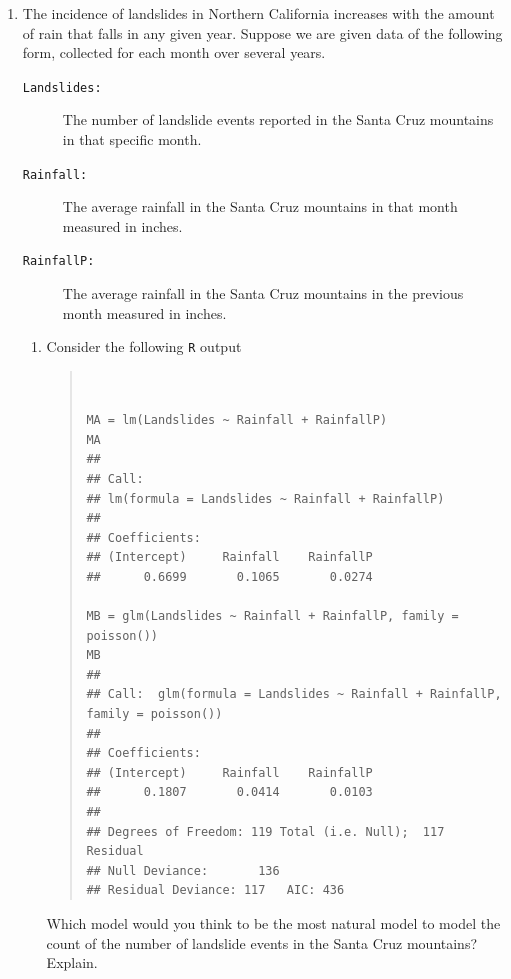\documentclass{article}
\begin{document}
\begin{enumerate}
\begin{enumerate}
\end{enumerate}




\newpage

\item The incidence of landslides in Northern California increases with the amount of rain that falls in any given year.
 Suppose we are given data of the following form, collected for each month over several years.
 \begin{description}
 \item[ \tt Landslides:] The number of landslide events reported in the Santa Cruz mountains in that specific month.
 \item[ \tt Rainfall:] The average rainfall in the Santa Cruz mountains in that month measured in inches.
 \item[ \tt RainfallP:] The  average rainfall in the Santa Cruz mountains in the previous month measured in inches.
 \end{description}

\begin{enumerate}
\item 
Consider the following {\tt R} output
\begin{quote}
\begin{verbatim}


MA = lm(Landslides ~ Rainfall + RainfallP)
MA
## 
## Call:
## lm(formula = Landslides ~ Rainfall + RainfallP)
## 
## Coefficients:
## (Intercept)     Rainfall    RainfallP  
##      0.6699       0.1065       0.0274
    
MB = glm(Landslides ~ Rainfall + RainfallP, family = poisson())
MB
## 
## Call:  glm(formula = Landslides ~ Rainfall + RainfallP, family = poisson())
## 
## Coefficients:
## (Intercept)     Rainfall    RainfallP  
##      0.1807       0.0414       0.0103  
## 
## Degrees of Freedom: 119 Total (i.e. Null);  117 Residual
## Null Deviance:	    136 
## Residual Deviance: 117 	AIC: 436
    \end{verbatim}
\end{quote}
\newpage

Which model would you think to be the most natural model to model the count of the number of landslide events
in the Santa Cruz mountains? Explain.


\end{enumerate}
\end{enumerate}
\end{document}
